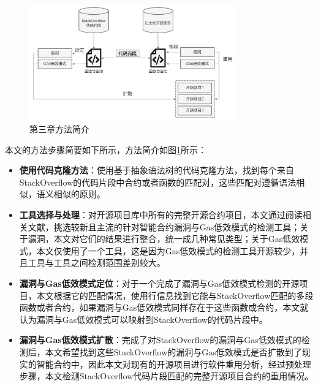 \begin{figure}[htbp]
\centering
\includegraphics[width=0.8\textwidth]{figures/chapter3Overview.png}
\caption{第三章方法简介}
\label{chapter3Overview}
\end{figure}

本文的方法步骤简要如下所示，方法简介如图\ref{chapter3Overview}所示：
\begin{itemize}
    \item \textbf{使用代码克隆方法}：使用基于抽象语法树的代码克隆方法，找到每个来自StackOverflow的代码片段中合约或者函数的匹配对，这些匹配对遵循语法相似，语义相似的原则。
    \item \textbf{工具选择与处理}：对开源项目库中所有的完整开源合约项目，本文通过阅读相关文献，挑选较新且主流的针对智能合约漏洞与Gas低效模式的检测工具；关于漏洞，本文对它们的结果进行整合，统一成几种常见类型；关于Gas低效模式，本文仅使用了一个工具，这是因为Gas低效模式的检测工具开源较少，并且工具与工具之间检测范围差别较大。
    \item \textbf{漏洞与Gas低效模式定位}：对于一个完成了漏洞与Gas低效模式检测的开源项目，本文根据它的匹配情况，使用行信息找到它能与StackOverflow匹配的多段函数或者合约，如果漏洞与Gas低效模式同样存在于这些函数或合约，本文就认为漏洞与Gas低效模式可以映射到StackOverflow的代码片段中。
    \item \textbf{漏洞与Gas低效模式扩散}：完成了对StackOverflow的漏洞与Gas低效模式的检测后，本文希望找到这些StackOverflow的漏洞与Gas低效模式是否扩散到了现实的智能合约中，因此本文对现有的开源项目进行软件重用分析，经过预处理步骤，本文检测StackOverflow代码片段匹配的完整开源项目合约的重用情况。
\end{itemize}



